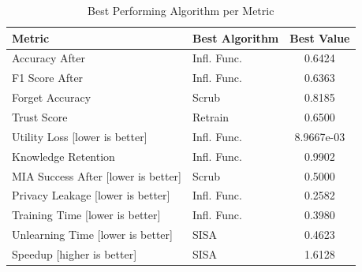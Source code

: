 \begin{table}[t]
\centering
\caption{Best Performing Algorithm per Metric}
\label{tab:best_overall}
\small
\begin{tabular}{l l c}
\toprule
Metric & Best Algorithm & Best Value \\
\midrule
Accuracy After & Infl. Func. & 0.6424 \\
F1 Score After & Infl. Func. & 0.6363 \\
Forget Accuracy & Scrub & 0.8185 \\
Trust Score & Retrain & 0.6500 \\
Utility Loss [lower is better] & Infl. Func. & 8.9667e-03 \\
Knowledge Retention & Infl. Func. & 0.9902 \\
MIA Success After [lower is better] & Scrub & 0.5000 \\
Privacy Leakage [lower is better] & Infl. Func. & 0.2582 \\
Training Time [lower is better] & Infl. Func. & 0.3980 \\
Unlearning Time [lower is better] & SISA & 0.4623 \\
Speedup [higher is better] & SISA & 1.6128 \\
\bottomrule
\end{tabular}
\end{table}
